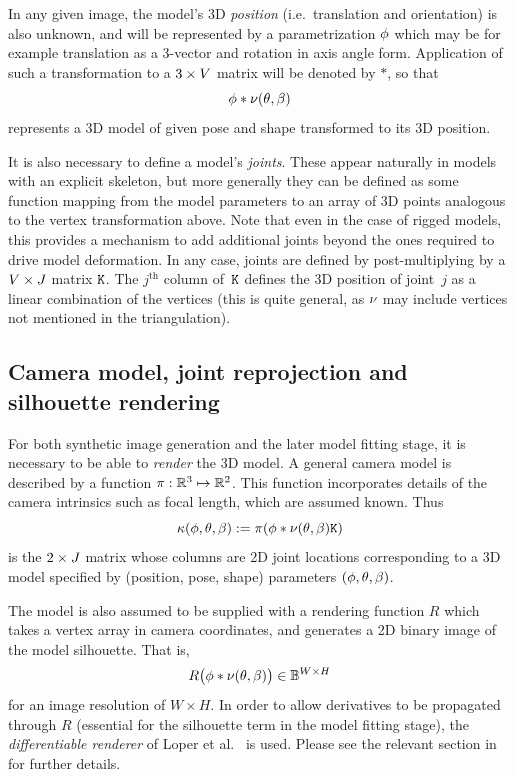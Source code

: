 In any given image, the model's 3D {\em position} (i.e.\ translation and orientation) is also unknown, and will be represented by a parametrization $\phi$ which may be for example translation as a 3-vector and rotation in axis angle form. Application of such a transformation to a $3\times V$ matrix will be denoted by $*$, so that 
\begin{equation}
\phi * \nu(\theta, \beta)
\end{equation}
represents a 3D model of given pose and shape transformed to its 3D position.

It is also necessary to define a model's {\em joints}.  These appear naturally in models with an explicit skeleton, but more generally they can be defined as some function mapping from the model parameters to an array of 3D points analogous to the vertex transformation above. Note that even in the case of rigged models, this provides a mechanism to add additional joints beyond the ones required to drive model deformation. In any case, joints are defined by post-multiplying by a $V \times J$ matrix $\mathtt{K}$.  The $j^{\text{th}}$ column of~$\mathtt{K}$ defines the 3D position of joint~$j$ as a linear combination of the vertices (this is quite general, as $\nu$ may include vertices not mentioned in the triangulation).  

\subsection{Camera model, joint reprojection and silhouette rendering}
For both synthetic image generation and the later model fitting stage, it is necessary to be able to \emph{render} the 3D model. A general camera model is described by a function $\pi: {\mathbb{R}^{3}} \mapsto {\mathbb{R}^{2}}$.  This function incorporates details of the camera intrinsics such as focal length, which are assumed known.  
Thus 
\begin{equation} \label{eq:project_joints}
\kappa(\phi, \theta, \beta) := \pi(\phi * \nu(\theta, \beta) \mathtt{K})
\end{equation}
is the $2\times J$ matrix whose columns are 2D joint locations corresponding to a 3D model specified by (position, pose, shape) parameters $(\phi, \theta, \beta)$.

The model is also assumed to be supplied with a rendering function $R$ which takes a vertex array in camera coordinates, and generates a 2D binary image of the model silhouette.  That is,
\begin{equation} \label{eq:render_sil}
R\bigl(\phi * \nu(\theta, \beta)\bigr) \in \mathbb{B}^{W\times H}
\end{equation}
for an image resolution of $W \times H$.  In order to allow derivatives to be propagated through $R$ (essential for the silhouette term in the model fitting stage), the \emph{differentiable renderer} of Loper et al.~\cite{loper2014opendr} is used. Please see the relevant section in  for further details.

